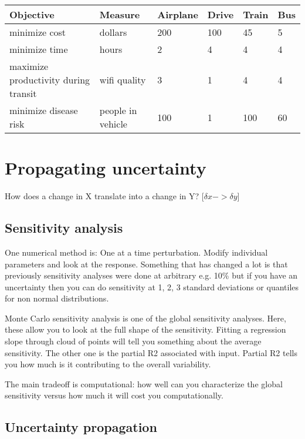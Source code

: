\documentclass[12pt, oneside]{article}   	%
\begin{document}
\begin{table}[h!]
\begin{tabular}{|l|l|l|l|l|l|}
\hline
Objective & Measure & Airplane & Drive & Train & Bus \\ \hline
minimize cost & dollars  & 200  & 100 & 45 & 5  \\ \hline
minimize time & hours & 2 & 4 & 4 & 4 \\ \hline
maximize productivity during transit & wifi quality & 3  & 1 & 4 & 4 \\ \hline
minimize disease risk & people in vehicle  & 100  & 1  & 100  & 60 \\ \hline
\end{tabular}
\end{table}

\section{Propagating uncertainty}

How does a change in X translate into a change in Y? [$\delta x -> \delta y$]

\subsection{Sensitivity analysis}

One numerical method is: One at a time perturbation. Modify individual parameters and look at the response. Something that has changed a lot is that previously sensitivity analyses were done at arbitrary e.g. 10\% but if you have an uncertainty then you can do sensitivity at 1, 2, 3 standard deviations or quantiles for non normal distributions.

Monte Carlo sensitivity analysis is one of the global sensitivity analyses. Here, these allow you to look at the full shape of the sensitivity. Fitting a regression slope through cloud of points will tell you something about the average sensitivity. The other one is the partial R2 associated with input. Partial R2 tells you how much is it contributing to the overall variability.

The main tradeoff is computational: how well can you characterize the global sensitivity versus how much it will cost you computationally.

\subsection{Uncertainty propagation}
\end{document}
